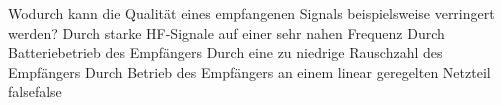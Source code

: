     {Wodurch kann die Qualität eines empfangenen Signals beispielsweise verringert werden?  }
    {Durch starke HF-Signale auf einer sehr nahen Frequenz }
    {Durch Batteriebetrieb des Empfängers}
    {Durch eine zu niedrige Rauschzahl des Empfängers}
    {Durch Betrieb des Empfängers an einem linear geregelten Netzteil}
    {false}{false}